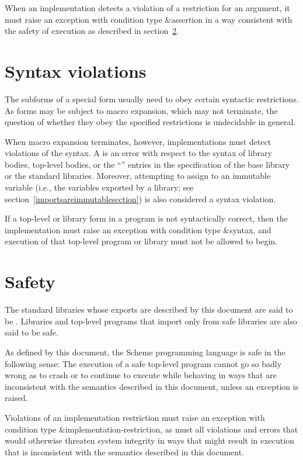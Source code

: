 When an implementation detects a violation of a restriction for an
argument, it must raise an exception with condition type
{\cf\&assertion} in a way consistent with the safety of execution as
described in section~\ref{safetysection}.

\section{Syntax violations}

The subforms of a special form usually need to obey certain syntactic
restrictions.  As forms may be subject to macro expansion, which may
not terminate, the question of whether they obey the specified
restrictions is undecidable in general.

When macro expansion terminates, however, implementations must detect
violations of the syntax.  A  is an error
with respect to the syntax of library bodies, top-level bodies,
or the ``\exprtype'' entries in the
specification of the base library or the standard libraries.
Moreover, attempting to assign to an immutable variable (i.e., the
variables exported by a library; see
section~\ref{importsareimmutablesection}) is also
considered a syntax violation.

If a top-level or library form in a program is not syntactically
correct, then the implementation must raise an exception with
condition type {\cf\&syntax}, and execution of that top-level program
or library must not be allowed to begin.

\section{Safety}
\label{safetysection}

The standard libraries whose exports are described by this document
are said to be .  Libraries and top-level
programs that import only from safe libraries are also said to be safe.

As defined by this document, the Scheme programming language
is safe in the following sense:
The execution of a safe top-level program
cannot go so badly wrong as to crash or to continue to
execute while behaving in ways that are
inconsistent with the semantics described in this document,
unless an exception is raised.

Violations of an implementation restriction must raise an
exception with condition type {\cf\&implementation-\hp{}restriction},
as must all
violations and errors that would otherwise threaten system
integrity in ways that might result in execution that is
inconsistent with the semantics described in this document.

